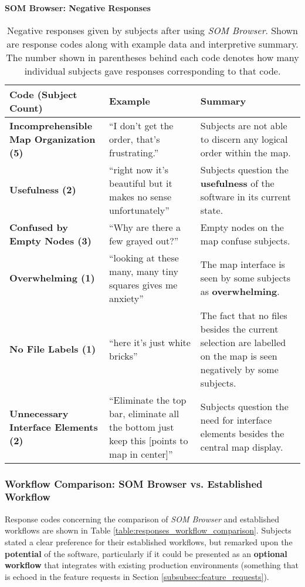 \begin{table}[!htb]
  \renewcommand{\arraystretch}{1.2}
  \centering
  \textbf{SOM Browser: Negative Responses} \\ [3mm]
  \footnotesize
  \colorbox{light-bg}{
  \begin{tabular}{ p{4.0cm} p{4.75cm} p{4.75cm} }
  \hline
    \textbf{Code (Subject Count)} & \textbf{Example} & \textbf{Summary} \\
    \hline
    \textbf{Incomprehensible Map Organization (5)}
    &
    ``I don't get the order, that’s frustrating.''
    &
    Subjects are not able to discern any logical order within the map.
    \\
    \textbf{Usefulness (2)}
    &
    ``right now it's beautiful but it makes no sense unfortunately''
    &
    Subjects question the \textbf{usefulness} of the software in its current
    state.
    \\
    \textbf{Confused by Empty Nodes (3)}
    &
    ``Why are there a few grayed out?''
    &
    Empty nodes on the map confuse subjects.
    \\
    \textbf{Overwhelming (1)}
    &
    ``looking at these many, many tiny squares gives me anxiety''
    &
    The map interface is seen by some subjects as \textbf{overwhelming}.
    \\
    \textbf{No File Labels (1)}
    &
    ``here it’s just white bricks''
    &
    The fact that no files besides the current selection are labelled on the map
    is seen negatively by some subjects.
    \\
    \textbf{Unnecessary Interface Elements (2)}
    &
    ``Eliminate the top bar, eliminate all the bottom just keep this [points to
    map in center]''
    &
    Subjects question the need for interface elements besides the central map
    display.
    \\
  \end{tabular}}
  \caption[\textit{SOM Browser}: Negative Responses]{Negative responses given
  by subjects after using \textit{SOM Browser}. Shown are response codes along
  with example data and interpretive summary. The number shown in parentheses
  behind each code denotes how many individual subjects gave responses
  corresponding to that code.}
  \label{table:responses_som-browser_negative}
\end{table}



\subsubsection{Workflow Comparison: SOM Browser vs. Established Workflow}
\label{subsubsec:workflow_comparison}
Response codes concerning the comparison of \textit{SOM Browser} and established
workflows are shown in Table \ref{table:responses_workflow_comparison}. Subjects
stated a clear preference for their established workflows, but remarked upon the
\textbf{potential} of the software, particularly if it could be presented as an
\textbf{optional workflow} that integrates with existing production environments
(something that is echoed in the feature requests in Section
\ref{subsubsec:feature_requests}).

